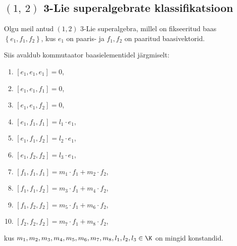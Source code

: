 \subsection{$(1,\ 2)$ 3-Lie superalgebrate klassifikatsioon}

Olgu meil antud $(1, 2)$ 3-Lie superalgebra, millel on fikseeritud baas
$\left\{ e_1, f_1, f_2 \right\}$, kus $e_1$ on paaris- ja
$f_1, f_2$ on paaritud baasivektorid.

Siis avaldub kommutaator baasielementidel järgmiselt:

\begin{multicols}{2}
\begin{enumerate}
    \item $\left[ e_1, e_1, e_1 \right] = 0$,
    \item $\left[ e_1, e_1, f_1 \right] = 0$,
    \item $\left[ e_1, e_1, f_2 \right] = 0$,
    \item $\left[ e_1, f_1, f_1 \right] = l_1 \cdot e_1$,
    \item $\left[ e_1, f_1, f_2 \right] = l_2 \cdot e_1$,
    \item $\left[ e_1, f_2, f_2 \right] = l_3 \cdot e_1$,
    \item $\left[ f_1, f_1, f_1 \right] = m_1 \cdot f_1 + m_2 \cdot f_2$,
    \item $\left[ f_1, f_1, f_2 \right] = m_3 \cdot f_1 + m_4 \cdot f_2$,
    \item $\left[ f_1, f_2, f_2 \right] = m_5 \cdot f_1 + m_6 \cdot f_2$,
    \item $\left[ f_2, f_2, f_2 \right] = m_7 \cdot f_1 + m_8 \cdot f_2$,
\end{enumerate}
\end{multicols}
kus $m_1, m_2, m_3, m_4, m_5, m_6, m_7, m_8, l_1, l_2, l_3 \in \K$
on mingid konstandid.

